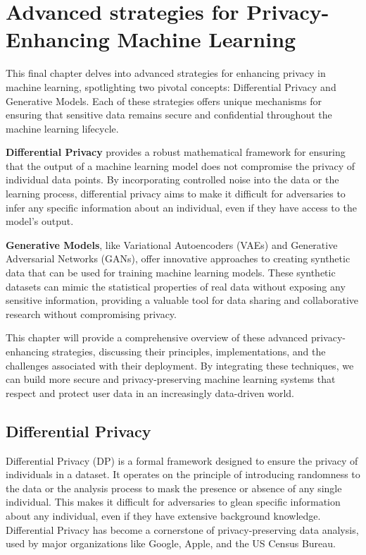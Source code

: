 \chapter{Advanced strategies for Privacy-Enhancing Machine Learning}

This final chapter delves into advanced strategies for enhancing privacy in machine learning, spotlighting two pivotal concepts: Differential Privacy and Generative Models. Each of these strategies offers unique mechanisms for ensuring that sensitive data remains secure and confidential throughout the machine learning lifecycle.

\textbf{Differential Privacy} provides a robust mathematical framework for ensuring that the output of a machine learning model does not compromise the privacy of individual data points. By incorporating controlled noise into the data or the learning process, differential privacy aims to make it difficult for adversaries to infer any specific information about an individual, even if they have access to the model's output.

\textbf{Generative Models}, like Variational Autoencoders (VAEs) and Generative Adversarial Networks (GANs), offer innovative approaches to creating synthetic data that can be used for training machine learning models. These synthetic datasets can mimic the statistical properties of real data without exposing any sensitive information, providing a valuable tool for data sharing and collaborative research without compromising privacy.

This chapter will provide a comprehensive overview of these advanced privacy-enhancing strategies, discussing their principles, implementations, and the challenges associated with their deployment. By integrating these techniques, we can build more secure and privacy-preserving machine learning systems that respect and protect user data in an increasingly data-driven world.

\section{Differential Privacy}


Differential Privacy (DP) is a formal framework designed to ensure the privacy of individuals in a dataset. It operates on the principle of introducing randomness to the data or the analysis process to mask the presence or absence of any single individual. This makes it difficult for adversaries to glean specific information about any individual, even if they have extensive background knowledge. Differential Privacy has become a cornerstone of privacy-preserving data analysis, used by major organizations like Google, Apple, and the US Census Bureau.

